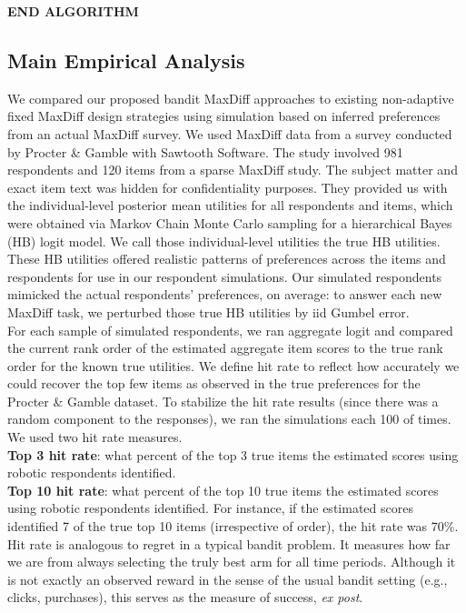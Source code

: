\documentclass[nonblindrev]{informs3}
\begin{document}
\textbf{END ALGORITHM}



\subsection{Main Empirical Analysis}
We compared our proposed bandit MaxDiff approaches to existing non-adaptive fixed MaxDiff design strategies using simulation based on inferred preferences from an actual MaxDiff survey. We used MaxDiff data from a survey conducted by Procter \& Gamble with Sawtooth Software. The study involved 981 respondents and 120 items from a sparse MaxDiff study. The subject matter and exact item text was hidden for confidentiality purposes. They provided us with the individual-level posterior mean utilities for all respondents and items, which were obtained via Markov Chain Monte Carlo sampling for a hierarchical Bayes (HB) logit model. We call those individual-level utilities the true HB utilities.  These HB utilities offered realistic patterns of preferences across the items and respondents for use in our respondent simulations.  Our simulated respondents mimicked the actual respondents' preferences, on average: to answer each new MaxDiff task, we perturbed those true HB utilities by iid Gumbel error.  \\
For each sample of simulated respondents, we ran aggregate logit and compared the current rank order of the estimated aggregate item scores to the true rank order for the known true utilities.  We define hit rate to reflect how accurately we could recover the top few items as observed in the true preferences for the Procter \& Gamble dataset.  To stabilize the hit rate results (since there was a random component to the responses), we ran the simulations each 100 of times. \\
We used two hit rate measures.\\ \textbf{Top 3 hit rate}: what percent of the top 3 true items the estimated scores using robotic respondents identified.\\ \textbf{Top 10 hit rate}: what percent of the top 10 true items the estimated scores using robotic respondents identified.  For instance, if the estimated scores identified 7 of the true top 10 items (irrespective of order), the hit rate was 70\%.\\
Hit rate is analogous to regret in a typical bandit problem. It measures how far we are from always selecting the truly best arm for all time periods. Although it is not exactly an observed reward in the sense of the usual bandit setting (e.g., clicks, purchases), this serves as the measure of success, \textit{ex post}.\\
\end{document}
